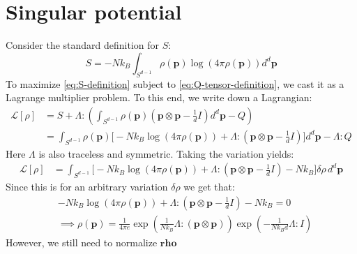 \documentclass[reqno]{article}
\begin{document}
\section{Singular potential}
Consider the standard definition for $S$:
\begin{equation} \label{eq:S-definition}
    S = -N k_B \int_{S^{d - 1}} \rho(\mathbf{p}) \log (4\pi \rho(\mathbf{p})) d^d \mathbf{p}
\end{equation}
To maximize \eqref{eq:S-definition} subject to \eqref{eq:Q-tensor-definition}, we cast it as a Lagrange multiplier problem.
To this end, we write down a Lagrangian:
\begin{equation}
    \begin{split}
        \mathcal{L}[\rho]
        &=
        S
        + \Lambda : \left( \int_{S^{d - 1}} \rho(\mathbf{p}) \left(\mathbf{p} \otimes \mathbf{p} - \tfrac1{d} I \right) d^d \mathbf{p}
        - Q \right) \\
        &=
        \int_{S^{d - 1}} \rho(\mathbf{p}) \biggl[ 
            -N k_B \log (4\pi \rho(\mathbf{p})) + \Lambda : \left(\mathbf{p} \otimes \mathbf{p} - \tfrac1{d} I \right)
        \biggr] d^d \mathbf{p}
        - \Lambda : Q
    \end{split}
\end{equation}
Here $\Lambda$ is also traceless and symmetric.
Taking the variation yields:
\begin{equation}
    \begin{split}
        \mathcal{L}[\rho]
        &=
        \int_{S^{d - 1}} \biggl[ 
            -N k_B \log (4\pi \rho(\mathbf{p})) + \Lambda : \left(\mathbf{p} \otimes \mathbf{p} - \tfrac1{d} I \right)
        - N k_B \biggr]
        \delta \rho \,
        d^d \mathbf{p}
    \end{split}
\end{equation}
Since this is for an arbitrary variation $\delta \rho$ we get that:
\begin{equation}
    \begin{split}
        &-N k_B \log (4\pi \rho(\mathbf{p})) 
        + \Lambda : \left(\mathbf{p} \otimes \mathbf{p} - \tfrac1{d} I \right)
        - N k_B
        = 0 \\
        &\implies
        \rho(\mathbf{p})
        =
        \frac{1}{4\pi e}
        \exp \left( \frac{1}{N k_B} \Lambda : \left(\mathbf{p}\otimes \mathbf{p}\right) \right)
        \exp \left(- \frac{1}{N k_B d} \Lambda : I \right)
    \end{split}
\end{equation}
However, we still need to normalize $\mathbf{rho}$ 
\end{document}
